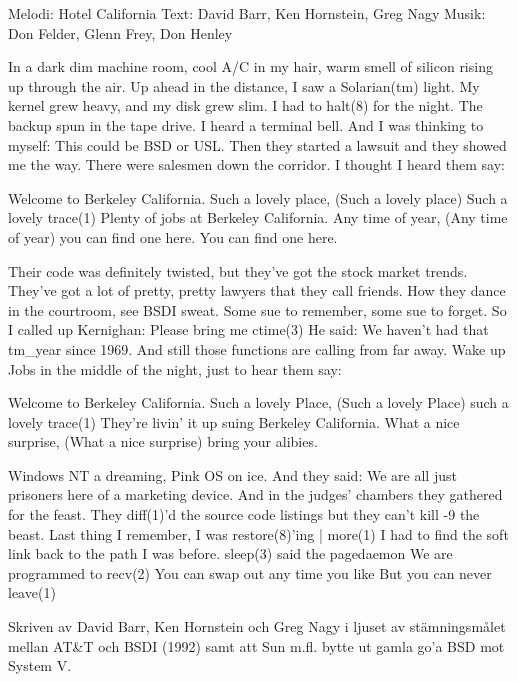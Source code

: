 \begin{song}

\begin{songmeta}
Melodi: Hotel California
Text: David Barr, Ken Hornstein, Greg Nagy
Musik: Don Felder, Glenn Frey, Don Henley
\end{songmeta}

\begin{songtext}
In a dark dim machine room,
cool A/C in my hair,
warm smell of silicon
rising up through the air.
Up ahead in the distance,
I saw a Solarian(tm) light.
My kernel grew heavy, and my disk grew slim.
I had to halt(8) for the night.
The backup spun in the tape drive.
I heard a terminal bell.
And I was thinking to myself:
This could be BSD or USL.
Then they started a lawsuit
and they showed me the way.
There were salesmen down the corridor.
I thought I heard them say:

Welcome to Berkeley California.
Such a lovely place, (Such a lovely place)
Such a lovely trace(1)
Plenty of jobs at Berkeley California.
Any time of year, (Any time of year)
you can find one here.
You can find one here.

Their code was definitely twisted,
but they've got the stock market trends.
They've got a lot of pretty, pretty lawyers
that they call friends.
How they dance in the courtroom,
see BSDI sweat.
Some sue to remember,
some sue to forget.
So I called up Kernighan:
Please bring me ctime(3)
He said:
We haven't had that tm\_year since 1969.
And still those functions are calling from far away.
Wake up Jobs in the middle of the night,
just to hear them say:

Welcome to Berkeley California.
Such a lovely Place,
(Such a lovely Place)
such a lovely trace(1)
They're livin' it up suing Berkeley California.
What a nice surprise,
(What a nice surprise)
bring your alibies.

\newpage
Windows NT a dreaming,
Pink OS on ice.
And they said:
We are all just prisoners here
of a marketing device.
And in the judges' chambers
they gathered for the feast.
They diff(1)'d the source code listings
but they can't kill -9 the beast.
Last thing I remember,
I was restore(8)'ing | more(1)
I had to find the soft link back
to the path I was before.
sleep(3) said the pagedaemon
We are programmed to recv(2)
You can swap out any time you like
But you can never leave(1)
\end{songtext}

\begin{songnotes}
Skriven av David Barr, Ken Hornstein och Greg Nagy i ljuset av stämningsmålet
mellan AT\&T och BSDI (1992) samt att Sun m.fl. bytte ut gamla go'a BSD mot System V.
\end{songnotes}
\end{song}
